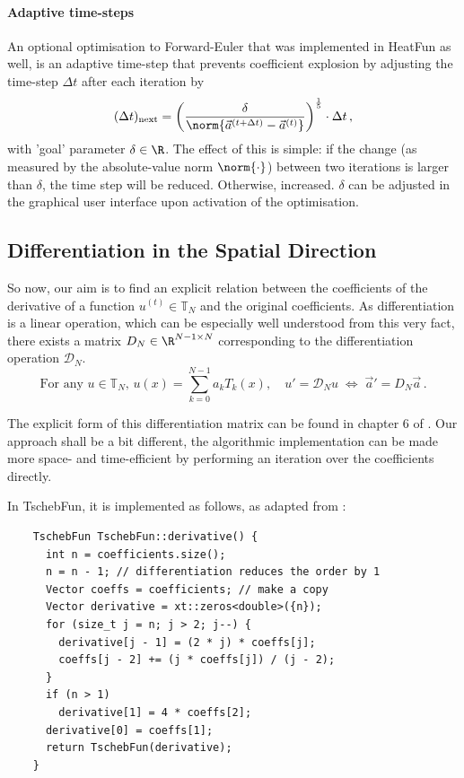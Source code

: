 \documentclass[12pt, a4paper]{article}
\begin{document}
  \paragraph{Adaptive time-steps}
  An optional optimisation to Forward-Euler that was implemented in HeatFun as well, is an adaptive time-step that prevents coefficient explosion by adjusting the time-step $\Delta t$ after each iteration by
  $$(\Delta t)_{\text{next}} = \left(\frac{\delta}{\norm{\vec{a}^{(t+\Delta t)} - \vec{a}^{(t)}}}\right)^{\frac{1}{5}} \cdot \Delta t \,,$$
  with 'goal' parameter $\delta \in \R$.
  The effect of this is simple: if the change (as measured by the absolute-value norm $\norm{\cdot}$) between two iterations is larger than $\delta$, the time step will be reduced. Otherwise, increased.
  $\delta$ can be adjusted in the graphical user interface upon activation of the optimisation.

  \subsection{Differentiation in the Spatial Direction}
  So now, our aim is to find an explicit relation between the coefficients of the derivative of a function $u^{(t)} \in \mathbb{T}_N$ and the original coefficients.
  As differentiation is a linear operation, which can be especially well understood from this very fact, there exists a matrix $D_N \in \R^{N-1 \times N}$ corresponding to the differentiation operation $\mathcal{D}_N$.
  $$\text{For any } u \in \mathbb{T}_N,\, u(x) = \sum_{k=0}^{N-1} a_k T_k(x), \quad u' = \mathcal{D}_N u \;\Leftrightarrow\; \vec{a}' = D_N \vec{a} \,.$$

  The explicit form of this differentiation matrix can be found in chapter 6 of \cite{spectralmethods}.
  Our approach shall be a bit different, the algorithmic implementation can be made more space- and time-efficient by performing an iteration over the coefficients directly.

  In \textcolor{themecolor3}{TschebFun}, it is implemented as follows, as adapted from \cite{numpy}:
  \begin{verbatim}
    TschebFun TschebFun::derivative() {
      int n = coefficients.size();
      n = n - 1; // differentiation reduces the order by 1
      Vector coeffs = coefficients; // make a copy
      Vector derivative = xt::zeros<double>({n});
      for (size_t j = n; j > 2; j--) {
        derivative[j - 1] = (2 * j) * coeffs[j];
        coeffs[j - 2] += (j * coeffs[j]) / (j - 2);
      }
      if (n > 1)
        derivative[1] = 4 * coeffs[2];
      derivative[0] = coeffs[1];
      return TschebFun(derivative);
    }
  \end{verbatim}
\end{document}
